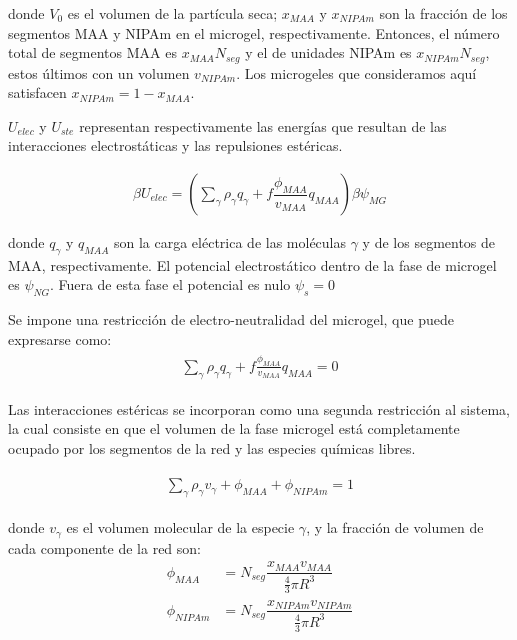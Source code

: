	
	\noindent donde $V_0$ es el volumen de la part\'icula seca; $x_{MAA}$ y $x_{NIPAm}$ son la fracci\'on de los segmentos MAA y NIPAm en el microgel, respectivamente.
	Entonces, el n\'umero total de segmentos MAA es $x_{MAA}N_{seg}$ y el de unidades NIPAm es $x_{NIPAm}N_{seg}$, estos \'ultimos con un volumen $v_{NIPAm}$.
	Los microgeles que consideramos aqu\'i satisfacen $x_{NIPAm}=1-x_{MAA}$.
	
	
	$U_{elec}$ y $U_{ste}$ representan respectivamente las energ\'ias que resultan de las interacciones electrost\'aticas y las repulsiones est\'ericas.
	
	\begin{align}
		\beta U_{elec} =\left(\sum_{\gamma } {\rho_\gamma q_\gamma + f\dfrac{\phi_{MAA}}{v_{MAA}}q_{MAA}}\right)\beta\psi_{MG}
	\end{align}
	
	\noindent donde $q_\gamma$ y $q_{MAA}$ son la carga el\'ectrica de las moléculas $\gamma$ y de los segmentos de MAA, respectivamente.
	El potencial electrost\'atico dentro de la fase de microgel es $\psi_{NG}$. Fuera de esta fase el potencial es nulo $\psi_s = 0$
	
	Se impone una restricci\'on de electro-neutralidad del microgel, que puede expresarse como:
	\begin{align}
		\begin{aligned}
			\sum_{\gamma  } \rho_\gamma q_\gamma + f\frac{\phi_{MAA}}{v_{MAA}}q_{MAA}=0
		\end{aligned}
		\label{eq:mc:charge-neutrality}
	\end{align}
	
	Las interacciones est\'ericas se incorporan como una segunda restricci\'on al sistema, la cual consiste en que el volumen de la fase microgel est\'a completamente ocupado por los segmentos de la red y las especies qu\'imicas libres.
	
	\begin{align}
		\begin{aligned}
			\sum_{\gamma } \rho_\gamma v_\gamma  + \phi_{MAA} + \phi_{NIPAm} = 1
		\end{aligned}
		\label{eq:mc:packing}
	\end{align}
	
	
	\noindent donde $v_\gamma$  es el volumen molecular de la especie $\gamma$, y la fracci\'on de volumen de cada componente de la red son: 
	\begin{align}
		\phi_{MAA}&=N_{seg}\dfrac{x_{MAA}v_{MAA}}{\frac{4}{3}\pi R^3}\\
		\phi_{NIPAm}&=N_{seg}\dfrac{x_{NIPAm}v_{NIPAm}}{\frac{4}{3}\pi R^3}
	\end{align}
	
